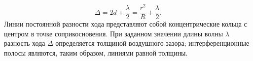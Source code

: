 \documentclass[a4paper, 12pt]{article}
\begin{document}
	\begin{equation}
		\Delta=2d+\frac{\lambda}{2}=\frac{r^2}{R}+\frac{\lambda}{2}.
	\end{equation}
	Линии постоянной разности хода представляют собой концентрические кольца с центром в точке соприкосновения. При заданном значении длины волны $\lambda$ разность хода $\Delta$ определяется толщиной воздушного зазора; интерференционные полосы являются, таким образом, линиями равной толщины.\par
\end{document}
